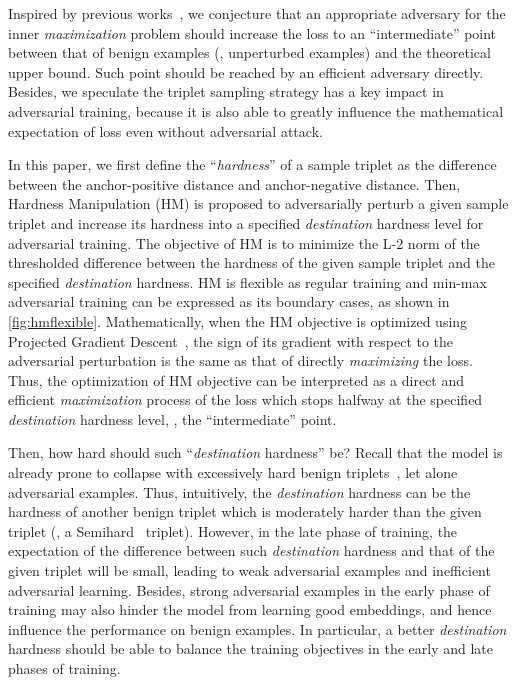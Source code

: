 \documentclass[10pt,twocolumn,letterpaper]{article}
\begin{document}

Inspired by previous works~\cite{advrank,robrank}, we conjecture that an
appropriate adversary for the inner \emph{maximization} problem should
increase the loss to an ``intermediate''
point between that of benign examples (\ie, unperturbed examples) and the
theoretical upper bound.
%
Such point should be reached by an efficient adversary directly.
%
Besides, we speculate the triplet sampling strategy has a key impact in
adversarial training, because it is also able to greatly influence the
mathematical expectation of loss even without adversarial attack.


In this paper, we first define the ``\emph{hardness}'' of a sample triplet as
the difference between the anchor-positive distance and anchor-negative
distance.
%
Then, Hardness Manipulation (HM) is proposed to adversarially perturb a given
sample triplet and increase its hardness into a specified \emph{destination}
hardness level for adversarial training.
%
The objective of HM is to minimize the L-$2$ norm of the thresholded difference
between the hardness of the given sample triplet and the specified
\emph{destination} hardness.
%
HM is flexible as regular training and min-max adversarial training
can be expressed as its boundary cases, as shown in \cref{fig:hmflexible}.
%
Mathematically, when the HM objective is optimized using Projected Gradient
Descent~\cite{madry}, the sign of its gradient with respect to the adversarial
perturbation is the same as that of directly \emph{maximizing} the loss.
%
Thus, the optimization of HM objective can be interpreted as a direct and
efficient \emph{maximization} process of the loss which stops halfway at the
specified \emph{destination} hardness level, \ie, the ``intermediate'' point.


Then, how hard should such ``\emph{destination} hardness'' be?
%
Recall that the model is already prone to collapse with excessively hard benign
triplets~\cite{facenet}, let alone adversarial examples.
%
Thus, intuitively, the \emph{destination} hardness can be the hardness of
another benign triplet which is moderately harder than the given triplet (\eg,
a Semihard~\cite{facenet} triplet).
%
However, in the late phase of training, the expectation of the difference
between such \emph{destination} hardness and that of the given triplet will be
small, leading to weak adversarial examples and inefficient adversarial
learning.
%
Besides, strong adversarial examples in the early phase of training may also
hinder the model from learning good embeddings, and hence influence the
performance on benign examples.
%
In particular, a better \emph{destination} hardness should be able to balance the
training objectives in the early and late phases of training.
\end{document}
